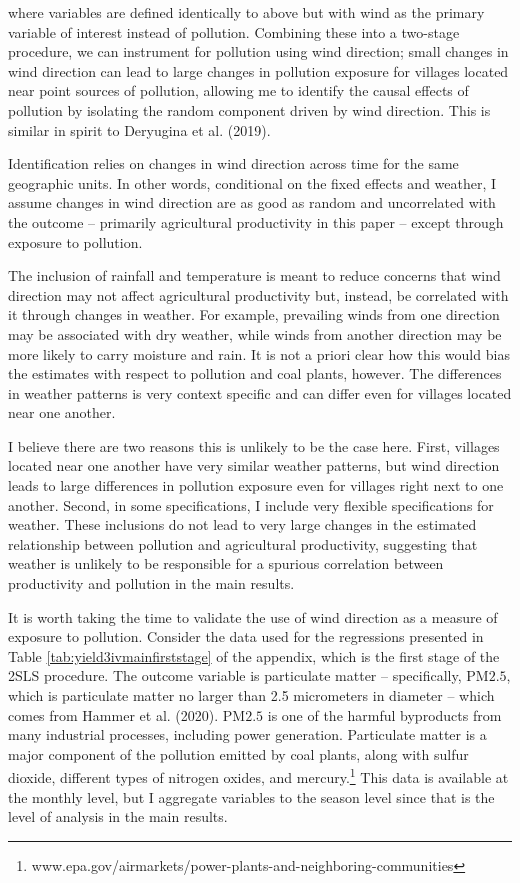 \documentclass[
]{article}
\begin{document}
where variables are defined identically to above but with wind as the primary variable of interest instead of pollution. Combining these into a two-stage procedure, we can instrument for pollution using wind direction; small changes in wind direction can lead to large changes in pollution exposure for villages located near point sources of pollution, allowing me to identify the causal effects of pollution by isolating the random component driven by wind direction. This is similar in spirit to Deryugina et al. (2019).

Identification relies on changes in wind direction across time for the same geographic units. In other words, conditional on the fixed effects and weather, I assume changes in wind direction are as good as random and uncorrelated with the outcome -- primarily agricultural productivity in this paper -- except through exposure to pollution.

The inclusion of rainfall and temperature is meant to reduce concerns that wind direction may not affect agricultural productivity but, instead, be correlated with it through changes in weather. For example, prevailing winds from one direction may be associated with dry weather, while winds from another direction may be more likely to carry moisture and rain. It is not a priori clear how this would bias the estimates with respect to pollution and coal plants, however. The differences in weather patterns is very context specific and can differ even for villages located near one another.

I believe there are two reasons this is unlikely to be the case here. First, villages located near one another have very similar weather patterns, but wind direction leads to large differences in pollution exposure even for villages right next to one another. Second, in some specifications, I include very flexible specifications for weather. These inclusions do not lead to very large changes in the estimated relationship between pollution and agricultural productivity, suggesting that weather is unlikely to be responsible for a spurious correlation between productivity and pollution in the main results.

It is worth taking the time to validate the use of wind direction as a measure of exposure to pollution. Consider the data used for the regressions presented in Table \ref{tab:yield3ivmainfirststage} of the appendix, which is the first stage of the 2SLS procedure. The outcome variable is particulate matter -- specifically, \(\mathrm{PM 2.5}\), which is particulate matter no larger than 2.5 micrometers in diameter -- which comes from Hammer et al. (2020). \(\mathrm{PM 2.5}\) is one of the harmful byproducts from many industrial processes, including power generation. Particulate matter is a major component of the pollution emitted by coal plants, along with sulfur dioxide, different types of nitrogen oxides, and mercury.\footnote{www.epa.gov/airmarkets/power-plants-and-neighboring-communities} This data is available at the monthly level, but I aggregate variables to the season level since that is the level of analysis in the main results.
\end{document}
